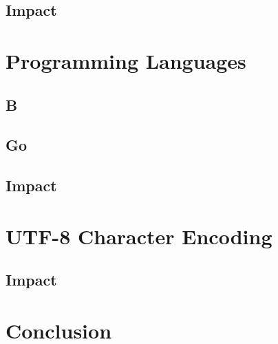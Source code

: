 \documentclass{article}
\begin{document}
\subsection{Impact}

\section{Programming Languages}
\subsection{B}
\subsection{Go}
\subsection{Impact}

\section{UTF-8 Character Encoding}
\subsection{Impact}

\section{Conclusion}



\end{document}
